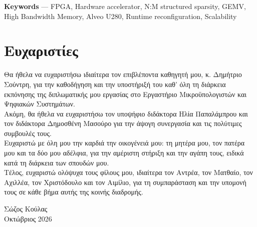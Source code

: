 \documentclass[greek, histinit, english, twosided]{book}
\begin{document}
\textbf{Keywords} --- FPGA, Hardware accelerator, N:M structured sparsity, GEMV, High Bandwidth Memory, Alveo U280, Runtime reconfiguration, Scalability

\chapter*{Ευχαριστίες}

Θα ήθελα να ευχαριστήσω ιδιαίτερα τον επιβλέποντα καθηγητή μου, κ. Δημήτριο Σούντρη, για την καθοδήγηση και την υποστήριξή του καθ' όλη τη διάρκεια εκπόνησης της διπλωματικής μου εργασίας στο Εργαστήριο Μικροϋπολογιστών και Ψηφιακών Συστημάτων.\\
Ακόμη, θα ήθελα να ευχαριστήσω τον υποψήφιο διδάκτορα Ηλία Παπαλάμπρου και τον διδάκτορα Δημοσθένη Μασούρο για την άψογη συνεργασία και τις πολύτιμες συμβουλές τους.\\
Ευχαριστώ με όλη μου την καρδιά την οικογένειά μου: τη μητέρα μου, τον πατέρα μου και τα δύο μου αδέλφια, για την αμέριστη στήριξη και την αγάπη τους, ειδικά κατά τη διάρκεια των σπουδών μου.\\
Τέλος, ευχαριστώ ολόψυχα τους φίλους μου, ιδιαίτερα τον Αντρέα, τον Ματθαίο, τον Αχιλλέα, τον Χριστόδουλο και τον Αιμίλιο, για τη συμπαράσταση και την υπομονή τους σε κάθε βήμα αυτής της κοινής διαδρομής.

\begin{flushright}
Σώζος Κούλας\\
Οκτώβριος 2026
\end{flushright}

\tableofcontents
\clearpage

\listoffigures

% 
% 

% 
% 
% 
% 
% 


% 
%
\printbibliography[heading=bibintoc]
\end{document}
